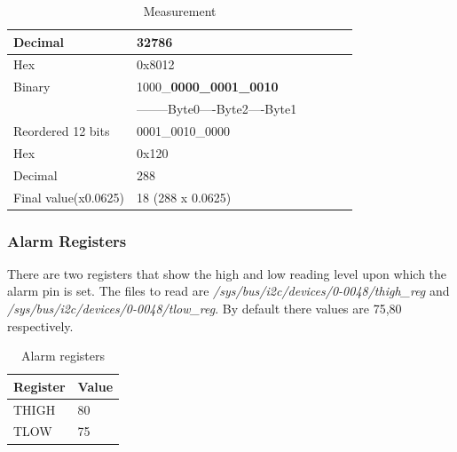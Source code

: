 \documentclass{article}
\begin{document}
\begin{table}[H]
\centering
 \begin{tabular}{|l|l|l|l|l|l|}
 \hline Decimal & 32786 \\
 \hline Hex & 0x8012 \\ 
 \hline Binary & 1000\_\textbf{0000\_0001\_0010}\\
               & --------{\scriptsize Byte0----Byte2----Byte1} \\ 
 \hline Reordered 12 bits & 0001\_0010\_0000\\
 \hline Hex & 0x120\\
 \hline Decimal & 288\\
 \hline Final value(x0.0625) & 18 (288 x 0.0625)\\ 
 \hline 
 \end{tabular} 
\caption{Measurement}
\end{table}

\subsubsection{Alarm Registers}
There are two registers that show the high and low reading level upon which the alarm pin is set. The files to read are \emph{/sys/bus/i2c/devices/0-0048/thigh\_reg} and 
\emph{/sys/bus/i2c/devices/0-0048/tlow\_reg}. By default there values are 75,80 respectively. 

\begin{table}[H]
\centering
 \begin{tabular}{|l|l|}
 \hline Register & Value \\ 
 \hline THIGH & 80 \\
 \hline TLOW & 75 \\
 \hline 
 \end{tabular} 
\caption{Alarm registers}
\end{table}
\end{document}
